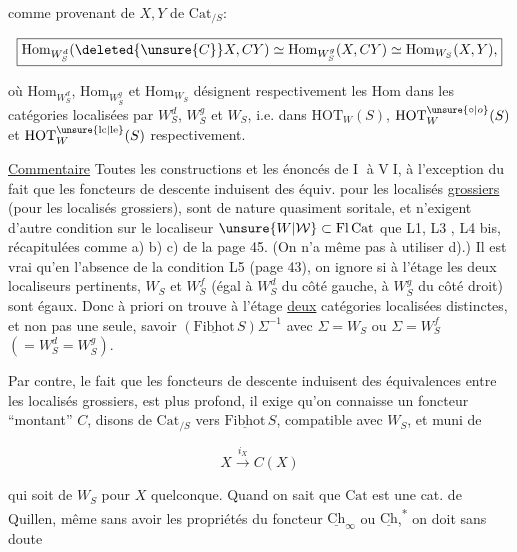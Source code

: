 
comme \inserted{\unsure{(,)}} provenant de $X,Y$ de $\mathrm{Cat}_{/S}$:

\[
\boxed{\mathrm{Hom}_{W_S^d}(\deleted{\unsure{C}}X,CY)\simeq\mathrm{Hom}_{W_S^g}(X,CY)\simeq\mathrm{Hom}_{W_S}(X,Y),}
\]


où $\mathrm{Hom}_{W_S^d}$, $\mathrm{Hom}_{W_S^g}$ et $\mathrm{Hom}_{W_S}$ désignent respectivement les  $\mathrm{Hom}$ dans les catégories localisées par $W_S^d$, $W_S^g$ et $W_S$, i.e. dans $\mathrm{HOT}_W(S)$, $\mathrm{HOT}_W^{\unsure{\circ|o}}(S)$ et $\mathrm{HOT}_W^{\unsure{\mathrm{lc}|\mathrm{le}}}(S)$ respectivement.

\uline{Commentaire} Toutes les constructions et les énoncés de \textcircled{I} à \textcircled{VI}, à l'exception du fait que les foncteurs de descente induisent des équiv. pour les localisés \uline{grossiers} (pour  les localisés grossiers),  sont de nature quasiment soritale, et n'exigent d'autre  condition sur le localiseur  $\unsure{W|\mathcal{W}}\subset\mathrm{Fl}\,\mathrm{Cat}$ que  L1, L3 , L4 bis, récapitulées comme a) b) c) de la page 45. (On n'a même pas à utiliser d).) Il est vrai qu'en l'absence de la condition L5 (page 43), on ignore si à l'étage les deux localiseurs pertinents, $W_S$ et $W_S^f$ (égal à $W_S^d$ du côté gauche, à $W_S^g$ du côté droit) sont égaux. Donc à priori on trouve à l'étage \uline{deux} catégories localisées  distinctes, et non pas une seule, savoir $(\underline{\mathrm{Fibhot}}\,S)\Sigma^{-1}$ avec $\Sigma=W_S$ ou $\Sigma=W_S^f$ $(=W_S^d=W_S^g)$.

Par contre, le fait que les foncteurs de descente induisent des équivalences entre les localisés grossiers, est plus profond, il exige   qu'on connaisse un foncteur ``montant'' $C$, disons de $\mathrm{Cat}_{/S}$ vers $\underline{\mathrm{Fibhot}}\,S$,  compatible avec $W_S$, et muni de

\[
X\xrightarrow{i_X}C(X)
\]

qui soit de $W_S$ pour $X$ quelconque. Quand on sait que $\mathrm{Cat}$ est une cat. de Quillen, même sans avoir les propriétés du foncteur $\underline{\mathrm{Ch}}_\infty$ ou $\underline{\mathrm{Ch}}$,\textsuperscript{*} on doit sans doute

